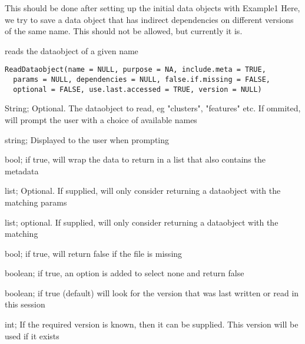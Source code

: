 \documentclass[a4paper]{book}
\begin{document}
%
\begin{Details}\relax
This should be done after setting up the initial data objects with Example1
Here, we try to save a data object that has indirect dependencies on different versions of the same
name. This should not be allowed, but currently it is.
\end{Details}
%
\begin{Description}\relax
reads the dataobject of a given name
\end{Description}
%
\begin{Usage}
\begin{verbatim}
ReadDataobject(name = NULL, purpose = NA, include.meta = TRUE,
  params = NULL, dependencies = NULL, false.if.missing = FALSE,
  optional = FALSE, use.last.accessed = TRUE, version = NULL)
\end{verbatim}
\end{Usage}
%
\begin{Arguments}
\begin{ldescription}
\item[\code{name}] String; Optional. The dataobject to read, eg "clusters", "features" etc.  If ommited, will prompt the user with a choice of available names

\item[\code{purpose}] string; Displayed to the user when prompting

\item[\code{include.meta}] bool; if true, will wrap the data to return in a list that also contains the metadata

\item[\code{params}] list; Optional. If supplied, will only consider returning a dataobject with the matching params

\item[\code{dependencies}] list; optional. If supplied, will only consider returning a dataobject with the matching

\item[\code{false.if.missing}] bool; if true, will return false if the file is missing

\item[\code{optional}] boolean; if true, an option is added to select none and return false

\item[\code{use.last.accessed}] boolean; if true (default) will look for the version that was last written or read in this session

\item[\code{version}] int; If the required version is known, then it can be supplied. This version will be used if it exists
\end{ldescription}
\end{Arguments}
\end{document}
